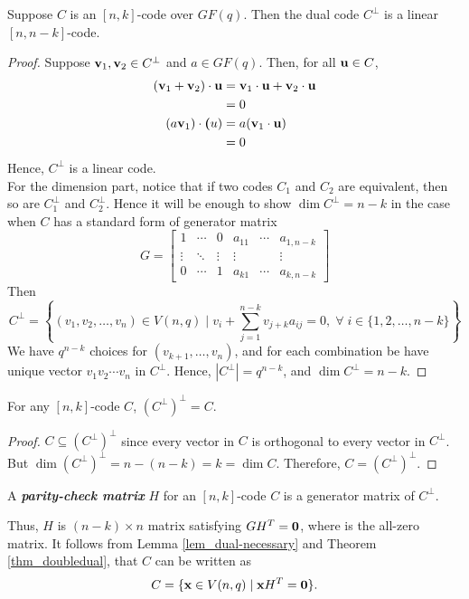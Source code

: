 \documentclass[../main.tex]{subfiles}
\begin{document}
\begin{thm}
	Suppose $C$ is an $[n,k]$-code over $GF(q)$. Then the dual code $C^\perp$ is a linear $[n,n-k]$-code.
\end{thm}

\begin{proof}
	Suppose $\textbf{v}_1, \textbf{v}_2\in C^\perp$ and $a\in GF(q)$. Then, for all $\textbf{u}\in C$,
	\begin{align*}
		(\textbf{v}_1+\textbf{v}_2)\cdot \textbf{u} &= \textbf{v}_1\cdot \textbf{u} +\textbf{v}_2\cdot \textbf{u}\\
		&= 0\\
		(a\textbf{v}_1)\cdot \textbf{(}u) &= a(\textbf{v}_1\cdot \textbf{u})\\
		&=0
	\end{align*}
	Hence, $C^{\perp}$ is a linear code.	\\
	For the dimension part, notice that if two codes $C_1$ and $C_2$ are equivalent, then so are $C_1^\perp$ and $C_2^\perp$. Hence it will be enough to show $\dim{C^\perp} = n-k$ in the case when $C$ has a standard form of generator matrix
	\[
		G = \begin{bmatrix}
			1 & \cdots  & 0 & a_{11} & \cdots & a_{1,n-k}\\
			\vdots & \ddots & \vdots & \vdots & & \vdots\\
			0 & \cdots & 1 & a_{k1} & \cdots & a_{k,n-k}
		\end{bmatrix}
	\]
	Then
	\[
		C^\perp = \left\{(v_1,v_2,\ldots,v_n)\in V(n,q) \;|\; v_i + \displaystyle\sum_{j=1}^{n-k}v_{j+k}a_{ij} = 0, \;\forall\; i \in \{1,2,\ldots,n-k\}\right\} 
	\]
	We have $q^{n-k}$ choices for $(v_{k+1},\ldots,v_n)$, and for each combination be have unique vector $v_1v_2\cdots v_n$ in $C^\perp$. Hence, $|C^{\perp}|=q^{n-k}$, and $\dim{C^\perp}=n-k$. 
\end{proof}

\begin{thm}\label{thm_doubledual}
	For any $[n,k]$-code $C$, $(C^\perp)^\perp= C$.
\end{thm}
\begin{proof}
	$C\subseteq (C^\perp)^\perp$ since every vector in $C$ is orthogonal to every vector in $C^\perp$. But $\dim{(C^\perp)^\perp}= n-(n-k)=k=\dim{C}$. Therefore, $C = (C^\perp)^\perp$.
\end{proof}

\begin{defn}
	A \textbf{\emph{parity-check matrix}} $H$ for an $[n,k]$-code $C$ is a generator matrix of $C^\perp$.
\end{defn}
Thus, $H$ is $(n-k)\times n$ matrix satisfying $GH^T=\textbf{0}$, where  is the all-zero matrix. It follows from Lemma \ref{lem_dual-necessary} and Theorem \ref{thm_doubledual}, that $C$ can be written as
\[
	C = \{\textbf{x}\in V(n,q) \;|\; \textbf{x}H^T = \textbf{0}\}.
\] 
\end{document}
